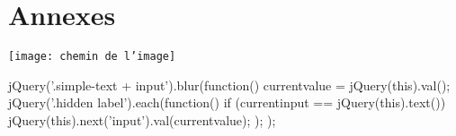 \documentclass[a4paper,11pt,twoside]{report}
\begin{document}
\chapter*{Annexes}

\listoffigures



\texttt{[image: chemin de l'image]}

\begin{verbatimtab}[4] 
jQuery('.simple-text + input').blur(function(){
            currentvalue = jQuery(this).val();
            jQuery('.hidden label').each(function() {
                if (currentinput == jQuery(this).text()) {
                    jQuery(this).next('input').val(currentvalue);
                }
            });
        });
\end{verbatimtab}
\end{document}
